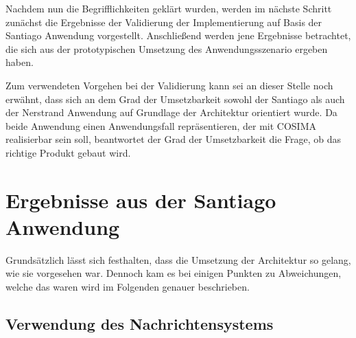   Nachdem nun die Begrifflichkeiten geklärt wurden, werden im nächste Schritt zunächst die Ergebnisse der Validierung der Implementierung auf Basis der Santiago Anwendung vorgestellt. Anschließend werden jene Ergebnisse betrachtet, die sich aus der prototypischen Umsetzung des Anwendungsszenario ergeben haben.
  
  Zum verwendeten Vorgehen bei der Validierung kann sei an dieser Stelle noch erwähnt, dass sich an dem Grad der Umsetzbarkeit sowohl der Santiago als auch der Nerstrand Anwendung auf Grundlage der Architektur orientiert wurde. Da beide Anwendung einen Anwendungsfall repräsentieren, der mit COSIMA realisierbar sein soll, beantwortet der Grad der Umsetzbarkeit die Frage, ob das richtige Produkt gebaut wird.
  

\section{Ergebnisse aus der Santiago Anwendung} %
\label{sec:ergebnisse_aus_der_santiago_anwendung}

  Grundsätzlich lässt sich festhalten, dass die Umsetzung der Architektur so gelang, wie sie vorgesehen war. Dennoch kam es bei einigen Punkten zu Abweichungen, welche das waren wird im Folgenden genauer beschrieben.
  
\subsection{Verwendung des Nachrichtensystems} %
\label{sub:verwendung_des_nachrichtensystems}

